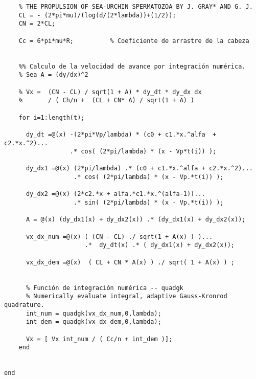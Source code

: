 \begin{lstlisting}[]
    % Se puede calcular mirar ABF 
    % THE PROPULSION OF SEA-URCHIN SPERMATOZOA BY J. GRAY* AND G. J. 
    CL = - (2*pi*mu)/(log(d/(2*lambda))+(1/2));  
    CN = 2*CL;

    Cc = 6*pi*mu*R;          % Coeficiente de arrastre de la cabeza

  
    %% Calculo de la velocidad de avance por integración numérica.
    % Sea A = (dy/dx)^2
    
    % Vx =  (CN - CL) / sqrt(1 + A) * dy_dt * dy_dx dx 
    %       / ( Ch/n +  (CL + CN* A) / sqrt(1 + A) )

    for i=1:length(t);

      dy_dt =@(x) -(2*pi*Vp/lambda) * (c0 + c1.*x.^alfa  + c2.*x.^2)...
                  .* cos( (2*pi/lambda) * (x - Vp*t(i)) );
      
      dy_dx1 =@(x) (2*pi/lambda) .* (c0 + c1.*x.^alfa + c2.*x.^2)...
                   .* cos( (2*pi/lambda) * (x - Vp.*t(i)) );
      
      dy_dx2 =@(x) (2*c2.*x + alfa.*c1.*x.^(alfa-1))...
                   .* sin( (2*pi/lambda) * (x - Vp.*t(i)) ); 

      A = @(x) (dy_dx1(x) + dy_dx2(x)) .* (dy_dx1(x) + dy_dx2(x));

      vx_dx_num =@(x) ( (CN - CL) ./ sqrt(1 + A(x) ) )...
                      .*  dy_dt(x) .* ( dy_dx1(x) + dy_dx2(x));
                  
      vx_dx_dem =@(x)  ( CL + CN * A(x) ) ./ sqrt( 1 + A(x) ) ;
  

      % Función de integración numérica -- quadgk
      % Numerically evaluate integral, adaptive Gauss-Kronrod quadrature.
      int_num = quadgk(vx_dx_num,0,lambda);
      int_dem = quadgk(vx_dx_dem,0,lambda);

      Vx = [ Vx int_num / ( Cc/n + int_dem )];
    end

    
end
\end{lstlisting}
